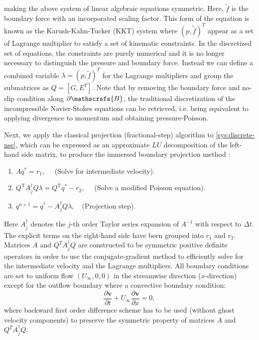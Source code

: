 \documentclass{article}
\numberwithin{equation}{section}
\begin{document}
making the above system of linear algebraic equations symmetric. 
	Here, $\tilde{f}$ is the boundary force with an incorporated scaling factor. This form of the equation is known as the Karush-Kahn-Tucker (KKT) system where $(p,\tilde{f})^T$ appear as a set of Lagrange multiplier to satisfy a set of kinematic constraints. In the discretized set of equations, the constraints are purely numerical and it is no longer necessary to distinguish the pressure and boundary force. Instead we can define a combined variable $\lambda = (p,\tilde{f})^T$ for the Lagrange multipliers and group the submatrices as $Q = [G, E^T]$. Note that by removing the boundary force and no-slip condition along $\partial \mathscrsfs{B}$, the traditional discretization of the incompressible Navier-Stokes equations can be retrieved, i.e. being equivalent to applying divergence to momentum and obtaining pressure-Poisson.

Next, we apply the classical projection (fractional-step) algorithm to \cref{sys:discrete-nse}, which can be expressed as an approximate $LU$ decomposition of the left-hand side matrix, to produce the immersed boundary projection method \cite{Colonius:2008}:
\begin{enumerate}
	\item $A q^*=r_1, \quad$ (Solve for intermediate velocity).
	\item $Q^{\mathrm{T}} A_j^{\dagger} Q \lambda=Q^{\mathrm{T}} q^*-r_2, \quad$ (Solve a modified Poisson equation).
	\item $q^{n+1}=q^*-A_j^{\dagger} Q \lambda, \quad$(Projection step).
\end{enumerate}
Here $A^{\dagger}_{j}$ denotes the $j$-th order Taylor series expansion of $A^{-1}$ with respect to $\Delta t$. The explicit terms on the right-hand side have been grouped into $r_1$ and $r_2$. Matrices $A$ and $Q^TA^\dagger_jQ$ are constructed to be symmetric positive definite operators in order to use the conjugate-gradient method to efficiently solve for the intermediate velocity and the Lagrange multipliers. All boundary conditions are set to uniform flow $(U_{\infty}, 0, 0)$ in the streamwise direction ($x$-direction) except for the outflow boundary where a convective boundary condition:
\begin{equation}
  \frac{\partial\boldsymbol{v}}{\partial t} + U_\infty \frac{\partial \boldsymbol{v}}{\partial x}=0,
\end{equation}
where backward first order difference scheme has to be used (without ghost velocity components) to preserve the symmetric property of matrices $A$ and $Q^TA^\dagger_jQ$.
\end{document}
